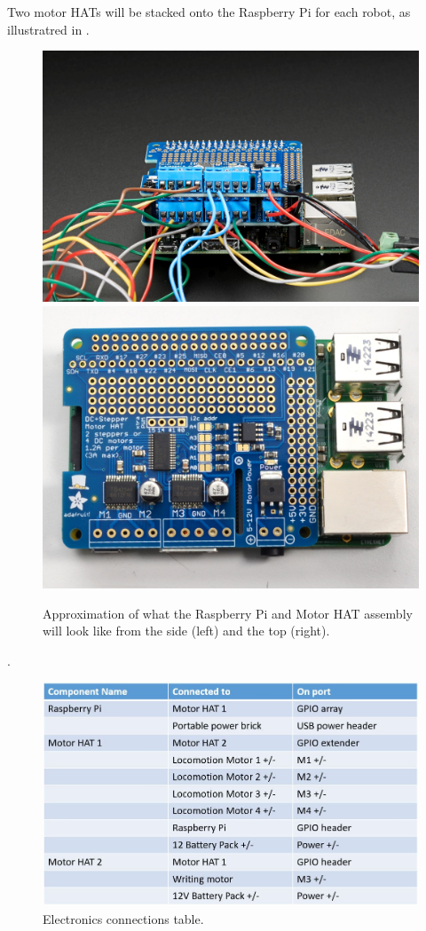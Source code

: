 Two motor HATs will be stacked onto the Raspberry Pi for each robot, as illustratred in .

\begin{figure}
\centering
\includegraphics[width=0.45\columnwidth]{figs/HATs-on-pi.jpg}
\includegraphics[width=0.45\columnwidth]{figs/HAT-on-pi.jpg}
\caption{Approximation of what the Raspberry Pi and Motor HAT assembly will look like from the side (left) and the top (right).}
\label{fig:HATs}
\end{figure}

 .

\begin{figure}
\centering
\includegraphics[width=0.9\columnwidth]{figs/electronics-table.JPG}
\caption{Electronics connections table.}
\label{fig:electronics-table}
\end{figure}
